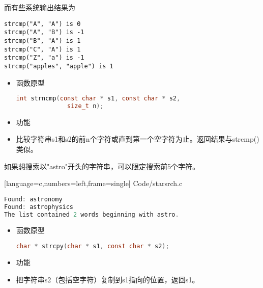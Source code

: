 \begin{frame}[fragile]
而有些系统输出结果为
\begin{lstlisting}[backgroundcolor=\color{red!20}]  
strcmp("A", "A") is 0
strcmp("A", "B") is -1
strcmp("B", "A") is 1
strcmp("C", "A") is 1
strcmp("Z", "a") is -1
strcmp("apples", "apple") is 1
\end{lstlisting}
\end{frame}

\begin{frame}[fragile]
\begin{itemize}
\item \textcolor{acolor1}{函数原型}
\begin{lstlisting}[language=c,backgroundcolor=\color{red!20}]
  int strncmp(const char * s1, const char * s2,
              size_t n);
\end{lstlisting}
\item \textcolor{acolor1}{功能}
\item[]
  比较字符串{\tf s1}和{\tf s2}的前{\tf n}个字符或直到第一个空字符为止。返回结果与{\tf strcmp()}类似。  
\end{itemize}    
\end{frame}

\begin{frame}[fragile]
如果想搜索以{\tf "astro"}开头的字符串，可以限定搜索前5个字符。
\end{frame}

\begin{frame}

[language=c,numbers=left,frame=single]
{Code/starsrch.c}
\end{frame}

\begin{frame}[fragile]
\begin{lstlisting}[language=c]
Found: astronomy
Found: astrophysics
The list contained 2 words beginning with astro.
\end{lstlisting}


\end{frame}

\begin{frame}[fragile] 
\begin{itemize}
\item \textcolor{acolor1}{函数原型}
  \begin{lstlisting}[language=c,backgroundcolor=\color{red!20}]
char * strcpy(char * s1, const char * s2);
\end{lstlisting}
\item 
  \textcolor{acolor1}{功能}
\item[]把字符串{\tf s2}（包括空字符）复制到{\tf s1}指向的位置，返回{\tf s1}。
\end{itemize}
\end{frame}

